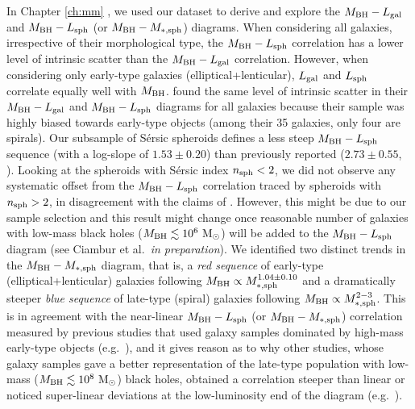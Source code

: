 In Chapter \ref{ch:mm} \citep{paperII}, we used our dataset to derive and explore 
the $M_{\rm BH} - L_{\rm gal}$ and $M_{\rm BH} - L_{\rm sph}$ (or $M_{\rm BH} - M_{\rm *,sph}$) diagrams. 
When considering all galaxies, irrespective of their morphological type, 
the $M_{\rm BH} - L_{\rm sph}$ correlation has a lower level of intrinsic scatter 
than the $M_{\rm BH} - L_{\rm gal}$ correlation. 
However, when considering only early-type galaxies (elliptical+lenticular), 
$L_{\rm gal}$ and $L_{\rm sph}$ correlate equally well with $M_{\rm BH}$. 
\citet{lasker2014anal} found the same level of intrinsic scatter in their 
$M_{\rm BH} - L_{\rm gal}$ and $M_{\rm BH} - L_{\rm sph}$ diagrams for all galaxies
because their sample was highly biased towards early-type objects 
(among their 35 galaxies, only four are spirals). 
Our subsample of S\'ersic spheroids defines a less steep $M_{\rm BH} - L_{\rm sph}$ 
sequence (with a log-slope of $1.53 \pm 0.20$) than previously reported ($2.73 \pm 0.55$, \citealt{grahamscott2013}). 
Looking at the spheroids with S\'ersic index $n_{\rm sph} < 2$, 
we did not observe any systematic offset 
from the $M_{\rm BH} - L_{\rm sph}$ correlation traced by spheroids with $n_{\rm sph} > 2$, 
in disagreement with the claims of \citet{sani2011}. 
However, this might be due to our sample selection and this result might change once reasonable number of galaxies 
with low-mass black holes ($M_{\rm BH} \lesssim 10^6 \rm~M_\odot$) will be added to the $M_{\rm BH} - L_{\rm sph}$ diagram 
(see Ciambur et al.~\emph{in preparation}).
We identified two distinct trends in the $M_{\rm BH} - M_{\rm *,sph}$ diagram, 
that is, a \emph{red sequence} of early-type (elliptical+lenticular) galaxies 
following $M_{\rm BH} \propto M_{\rm *,sph}^{1.04 \pm 0.10}$ 
and a dramatically steeper \emph{blue sequence} of late-type (spiral) galaxies 
following $M_{\rm BH} \propto M_{\rm *,sph}^{2-3}$. 
This is in agreement with the near-linear $M_{\rm BH} - L_{\rm sph}$ (or $M_{\rm BH} - M_{\rm *,sph}$) correlation 
measured by previous studies that used galaxy samples dominated by high-mass early-type objects 
(e.g.~\citealt{magorrian1998,marconihunt2003,haringrix2004,gultelkin2009,sani2011,beifiori2012,
erwingadotti2012,vika2012}), 
and it gives reason as to why other studies, 
whose galaxy samples gave a better representation of the late-type population 
with low-mass ($M_{\rm BH} \lesssim 10^8 \rm~M_\odot$) black holes, 
obtained a correlation steeper than linear 
or noticed super-linear deviations at the low-luminosity end of the diagram 
(e.g.~\citealt{laor1998,laor2001,wandel1999,salucci2000,ryan2007}). 
